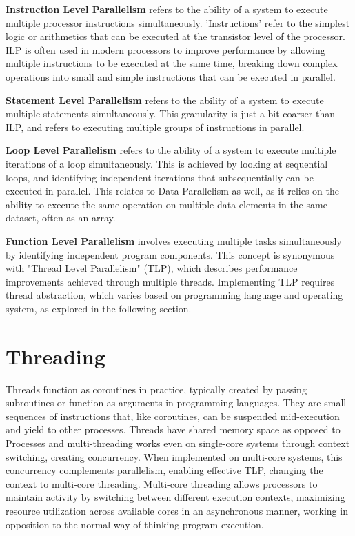 \documentclass[12pt,a4paper]{article}
\begin{document}
\textbf{Instruction Level Parallelism} refers to the ability of a system to execute multiple processor instructions simultaneously\parencite[pp. 115-116]{Rauber2023}. 'Instructions' refer to the simplest logic or arithmetics that can be executed at the transistor level of the processor. ILP is often used in modern processors to improve performance by allowing multiple instructions to be executed at the same time, breaking down complex operations into small and simple instructions that can be executed in parallel. 

\textbf{Statement Level Parallelism} refers to the ability of a system to execute multiple statements simultaneously\parencite[pp. 114]{Rauber2023}. This granularity is just a bit coarser than ILP, and refers to executing multiple groups of instructions in parallel.

\textbf{Loop Level Parallelism} refers to the ability of a system to execute multiple iterations of a loop simultaneously\parencite[pp. 118-121]{Rauber2023}. This is achieved by looking at sequential loops, and identifying independent iterations that subsequentially can be executed in parallel. This relates to Data Parallelism\parencite[pp. 116-118]{Rauber2023} as well, as it relies on the ability to execute the same operation on multiple data elements in the same dataset, often as an array. 

\textbf{Function Level Parallelism} involves executing multiple tasks simultaneously by identifying independent program components\parencite[pp. 114, 121-122]{Rauber2023}. This concept is synonymous with "Thread Level Parallelism" (TLP)\parencite[pp. 27-36]{Rauber2023}, which describes performance improvements achieved through multiple threads. Implementing TLP requires thread abstraction, which varies based on programming language and operating system, as explored in the following section.

\section{Threading}

Threads function as coroutines in practice, typically created by passing subroutines or function as arguments in programming languages. They are small sequences of instructions that, like coroutines, can be suspended mid-execution and yield to other processes. Threads have shared memory space as opposed to Processes\parencite[p. 4]{Rauber2023} and multi-threading works even on single-core systems through context switching\parencite{Rauber2023}, creating concurrency. When implemented on multi-core systems, this concurrency complements parallelism, enabling effective TLP, changing the context to multi-core threading. Multi-core threading allows processors to maintain activity by switching between different execution contexts, maximizing resource utilization across available cores in an asynchronous manner, working in opposition to the normal way of thinking program execution\parencite{Rajsbaum2020}.
\end{document}

